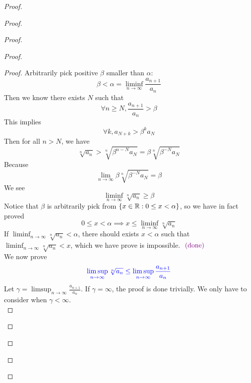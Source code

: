 \documentclass{report}
\begin{document}
\begin{proof}
\begin{proof}
\begin{proof}
\begin{proof}
\begin{proof}
Arbitrarily pick positive $\beta $ smaller than $\alpha $:
\begin{equation}
\beta <\alpha=\liminf_{n\to\infty} \frac{a_{n+1}}{a_n}
\end{equation}
Then we know there exists $N$ such that
 \begin{equation}
\forall n\geq N, \frac{a_{n+1}}{a_n}>\beta 
\end{equation}
This implies 
\begin{equation}
\forall k, a_{N+k}>\beta^k a_N
\end{equation}
Then for all $n>N$, we have
 \begin{equation}
   \sqrt[n]{a_n}>\sqrt[n]{ \beta^{n-N}a_{N}}=\beta \sqrt[n]{\beta^{-N}a_N} 
\end{equation}
Because 
\begin{equation}
\lim_{n\to\infty}\beta \sqrt[n]{\beta^{-N}a_N}=\beta 
\end{equation}
We see
\begin{equation}
\liminf_{n\to\infty} \sqrt[n]{a_n} \geq \beta 
\end{equation} 
Notice that $\beta $ is arbitrarily pick from $\{ x\in\mathbb{R}: 0\leq x<\alpha  \}$, so we have in fact proved
\begin{equation}
0\leq x<\alpha \implies x\leq \liminf_{n\to\infty} \sqrt[n]{a_n} 
\end{equation}
If $\liminf_{n\to\infty} \sqrt[n]{a_n} <\alpha $, there should exists $x<\alpha $ such that $\liminf_{n\to\infty} \sqrt[n]{a_n} <x$, which we have prove is impossible. $\textcolor{violet}{\text{ (done) }}$\\

We now prove 
\begin{equation}
\textcolor{blue}{\limsup_{n\to\infty} \sqrt[n]{a_n}\leq \limsup_{n\to\infty} \frac{a_{n+1}}{a_n}}
\end{equation}
Let $\gamma =\limsup_{n\to\infty} \frac{a_{n+1}}{a_n}$.  If $\gamma =\infty$, the proof is done trivially. We only have to consider when $\gamma<\infty$.\\


\end{proof}
\end{proof}
\end{proof}
\end{proof}
\end{proof}
\end{document}
